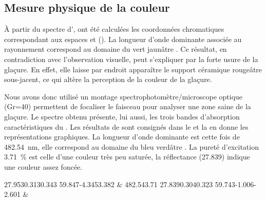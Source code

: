 \subsection{Mesure physique de la couleur}
À partir du spectre d'\AO, ont été calculées les coordonnées 
chromatiques correspondant aux espaces \Yxy et \Lab 
(). La longueur d'onde dominante associée 
au rayonnement correspond au domaine du vert jaunâtre 
\autocite{Kelly_1976}. Ce résultat, en contradiction avec 
l'observation visuelle, peut s'expliquer par la forte usure de la 
glaçure. En effet, elle laisse par endroit apparaître le support 
céramique rougeâtre sous-jacent, ce qui altère la perception de la 
couleur de la glaçure.

Nous avons donc utilisé un montage spectrophotomètre/microscope 
optique (Gr=40) permettent de focaliser le faisceau pour analyser 
une zone saine de la glaçure. Le spectre obtenu présente, lui aussi, 
les trois bandes d'absorption caractéristiques du . 
Les résultats de \CHRO sont consignés dans le  et 
la  en donne les représentations graphiques. 
La longueur d'onde dominante est cette fois de \SI{482.54}{\nm}, 
elle correspond au domaine du bleu verdâtre \autocite{Kelly_1976}. 
La pureté d'excitation \SI{3.71}{\percent} est celle d'une couleur très 
peu saturée, la réflectance \CIEY (\num{27.839}) indique une couleur 
assez foncée.

\begin{table}[hbt]
  \caption[\ -- Coordonnées chromatiques et longueur d'onde 
           dominante]
          {\legendeB.
           Coordonnées chromatiques dans les systèmes \Yxy et \Lab 
           et longueur d'onde dominante (illuminant D65, \ang{2},
           \SIrange{400}{700}{\nm}). (\up{\dag}\,\cite{Kelly_1976})}
  \label{saotab:6529}
  \begin{chrotab}[Appareillage]
               {27.953}{0.313}{0.343}
               {59.847}{-4.345}{3.382} &
    \tabularnewline
               {482.54}{3.71}
               {27.839}{0.304}{0.323}
               {59.743}{-1.006}{-2.601} &
    \tabularnewline
  \end{chrotab}
\end{table}

